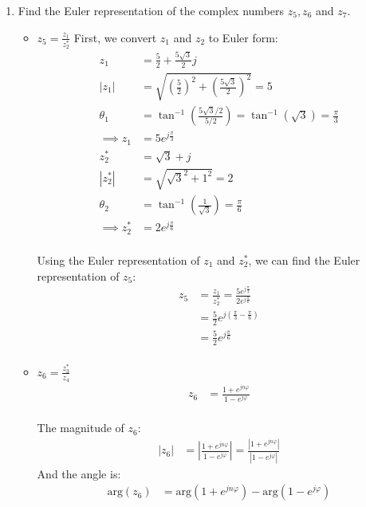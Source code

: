 \documentclass{article}
\begin{document}
\begin{enumerate}
    \item Find the Euler representation of the complex numbers $z_5, z_6$ and $z_7$.

    \begin{itemize}
        \item $z_5 = \frac{z_1}{z^*_2}$
        First, we convert $z_1$ and $z_2$ to Euler form:
        \begin{align*}
            z_1 &= \frac{5}{2} + \frac{5\sqrt{3}}{2}j \\
            |z_1| &= \sqrt{\left(\frac{5}{2}\right)^2 + \left(\frac{5\sqrt{3}}{2}\right)^2} = 5 \\
            \theta_1 &= \tan^{-1}\left(\frac{5\sqrt{3}/2}{5/2}\right) = \tan^{-1}(\sqrt{3}) = \frac{\pi}{3} \\
            \implies z_1 &= 5e^{j\frac{\pi}{3}} \\
            z^*_2 &= \sqrt{3} + j \\
            |z^*_2| &= \sqrt{\sqrt{3}^2 + 1^2} = 2 \\
            \theta_2 &= \tan^{-1}\left(\frac{1}{\sqrt{3}}\right) = \frac{\pi}{6} \\
            \implies z^*_2 &= 2e^{j\frac{\pi}{6}} \\
        \end{align*}

        Using the Euler representation of $z_1$ and $z^*_2$, we can find the Euler representation of $z_5$:
        \begin{align*}
            z_5 &= \frac{z_1}{z^*_2} = \frac{5e^{j\frac{\pi}{3}}}{2e^{j\frac{\pi}{6}}} \\
            &= \frac{5}{2}e^{j\left(\frac{\pi}{3} - \frac{\pi}{6}\right)} \\
            &= \frac{5}{2}e^{j\frac{\pi}{6}} \\
        \end{align*}

        \item $z_6 = \frac{z^*_3}{z_4}$
        \begin{align*}
            z_6 &= \frac{1+e^{jn\varphi}}{1-e^{j\varphi}} \\
        \end{align*}

        The magnitude of $z_6$:
        \begin{align*}
            |z_6| &= \left|\frac{1+e^{jn\varphi}}{1-e^{j\varphi}}\right| = \frac{\left|1+e^{jn\varphi}\right|}{\left|1-e^{j\varphi}\right|}
        \end{align*}
        And the angle is:
        \begin{align*}
            \text{arg}(z_6) &= \text{arg}(1+e^{jn\varphi}) - \text{arg}(1-e^{j\varphi}) \\
        \end{align*}


\end{itemize}
\end{enumerate}
\end{document}
